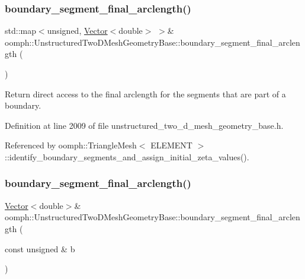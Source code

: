 \subsubsection{\texorpdfstring{boundary\+\_\+segment\+\_\+final\+\_\+arclength()}{boundary\_segment\_final\_arclength()}\hspace{0.1cm}{\footnotesize\ttfamily [1/2]}}
{\footnotesize\ttfamily std\+::map$<$unsigned, \hyperlink{classoomph_1_1Vector}{Vector}$<$double$>$ $>$\& oomph\+::\+Unstructured\+Two\+D\+Mesh\+Geometry\+Base\+::boundary\+\_\+segment\+\_\+final\+\_\+arclength (\begin{DoxyParamCaption}{ }\end{DoxyParamCaption})\hspace{0.3cm}{\ttfamily [inline]}}



Return direct access to the final arclength for the segments that are part of a boundary. 



Definition at line 2009 of file unstructured\+\_\+two\+\_\+d\+\_\+mesh\+\_\+geometry\+\_\+base.\+h.



Referenced by oomph\+::\+Triangle\+Mesh$<$ E\+L\+E\+M\+E\+N\+T $>$\+::identify\+\_\+boundary\+\_\+segments\+\_\+and\+\_\+assign\+\_\+initial\+\_\+zeta\+\_\+values().

\mbox{\label{classoomph_1_1UnstructuredTwoDMeshGeometryBase_a1a97201d4f2c21a1612296a58ba2358d}} 
\subsubsection{\texorpdfstring{boundary\+\_\+segment\+\_\+final\+\_\+arclength()}{boundary\_segment\_final\_arclength()}\hspace{0.1cm}{\footnotesize\ttfamily [2/2]}}
{\footnotesize\ttfamily \hyperlink{classoomph_1_1Vector}{Vector}$<$double$>$\& oomph\+::\+Unstructured\+Two\+D\+Mesh\+Geometry\+Base\+::boundary\+\_\+segment\+\_\+final\+\_\+arclength (\begin{DoxyParamCaption}\item[{const unsigned \&}]{b }\end{DoxyParamCaption})\hspace{0.3cm}{\ttfamily [inline]}}



